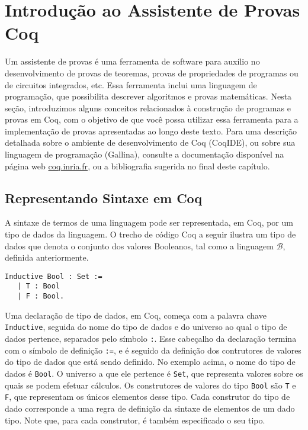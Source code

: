 \section{Introdu\c{c}\~ao ao Assistente de Provas Coq}\label{cap1:coq}

Um assistente de provas \'e uma ferramenta de software para auxílio no desenvolvimento de provas de teoremas, provas de propriedades de programas ou de circuitos integrados, etc. Essa ferramenta inclui uma linguagem de programa\c{c}\~ao, que possibilita descrever  algoritmos e provas matem\'aticas. Nesta seção, introduzimos alguns conceitos relacionados à construção de programas e provas em Coq, com o objetivo de que você possa utilizar essa ferramenta para a implementação de provas apresentadas ao longo deste texto. Para uma descrição detalhada sobre o ambiente de desenvolvimento de Coq (CoqIDE), ou sobre sua linguagem de programação (Gallina), consulte a documentação disponível na página web \url{coq.inria.fr}, ou a bibliografia sugerida no final deste capítulo.

\subsection{Representando Sintaxe em Coq}

A sintaxe de termos de uma linguagem pode ser representada, em Coq, por um tipo de dados da linguagem. O trecho de c\'odigo Coq a seguir ilustra um tipo de dados que denota o conjunto dos valores Booleanos, tal como a linguagem $\mathcal{B}$, definida anteriormente.

\begin{lstlisting}
Inductive Bool : Set :=
   | T : Bool
   | F : Bool.
\end{lstlisting}

Uma declaração de tipo de dados, em Coq, começa com a palavra chave \texttt{Inductive}, seguida do nome do tipo de dados e do universo ao qual o tipo de dados pertence, separados pelo símbolo \texttt{:}. Esse cabeçalho da declaração termina com o símbolo de definição \texttt{:=}, e é seguido da definição dos contrutores de valores do tipo de dados que está sendo definido. No exemplo acima, o nome do tipo de dados é \texttt{Bool}. O universo a que ele pertence é \texttt{Set}, que representa valores sobre os quais se podem efetuar c\'alculos. Os construtores de valores do tipo \texttt{Bool} são \texttt{T} e \texttt{F}, que representam os únicos elementos desse tipo. Cada construtor do tipo de dado corresponde a uma regra de definição da sintaxe de elementos de um dado tipo. Note que, para cada construtor, é também especificado o seu tipo.

